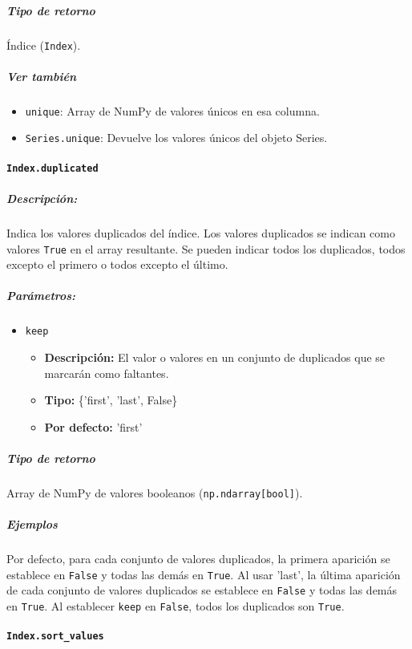 \subparagraph{Tipo de retorno}
Índice (\texttt{Index}).

\subparagraph{Ver también}
\begin{itemize}
    \item \texttt{unique}: Array de NumPy de valores únicos en esa columna.
    \item \texttt{Series.unique}: Devuelve los valores únicos del objeto
          Series.
\end{itemize}

\paragraph{\texttt{Index.duplicated}}

\subparagraph{Descripción:}
Indica los valores duplicados del índice. Los valores duplicados se indican
como valores \texttt{True} en el array resultante. Se pueden indicar todos los
duplicados, todos excepto el primero o todos excepto el último.

\subparagraph{Parámetros:}

\begin{itemize}
    \item \texttt{keep}
          \begin{itemize}
              \item \textbf{Descripción:} El valor o valores en un conjunto de
                    duplicados que se marcarán como faltantes.
              \item \textbf{Tipo:} \{'first', 'last', False\}
              \item \textbf{Por defecto:} 'first'
          \end{itemize}
\end{itemize}

\subparagraph{Tipo de retorno}
Array de NumPy de valores booleanos (\texttt{np.ndarray[bool]}).

\subparagraph{Ejemplos}
Por defecto, para cada conjunto de valores duplicados, la primera aparición se
establece en \texttt{False} y todas las demás en \texttt{True}. Al usar 'last',
la última aparición de cada conjunto de valores duplicados se establece en
\texttt{False} y todas las demás en \texttt{True}. Al establecer \texttt{keep}
en \texttt{False}, todos los duplicados son \texttt{True}.

\paragraph{\texttt{Index.sort\_values}}

